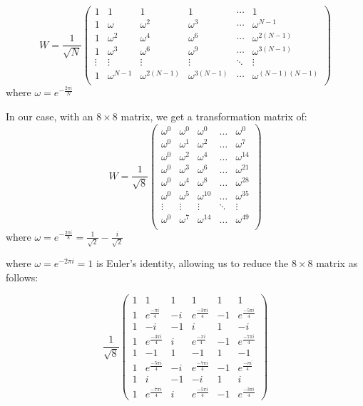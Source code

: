 \documentclass{article}
\begin{document}
\[ W = \frac{1}{\sqrt{N}}  
	\begin{pmatrix}
		1&1&1&1&\cdots &1 \\
		1&\omega&\omega^2&\omega^3&\cdots&\omega^{N-1} \\
		1&\omega^2&\omega^4&\omega^6&\cdots&\omega^{2(N-1)}\\
		1&\omega^3&\omega^6&\omega^9&\cdots&\omega^{3(N-1)}\\
		\vdots&\vdots&\vdots&\vdots&\ddots&\vdots\\
		1&\omega^{N-1}&\omega^{2(N-1)}&\omega^{3(N-1)}&\cdots&\omega^{(N-1)(N-1)}\\
	\end{pmatrix}
\]
where $ \omega = e^{-\frac{2\pi i}{N}} $ 


In our case, with an $8\times8$ matrix, we get a transformation matrix of:
\[ W= 
	\frac{1}{\sqrt{8}}
	\begin{pmatrix}
		\omega^0     & \omega^0   &\omega^0   & \ldots & \omega^0        \\
		\omega^0     & \omega^1   &\omega^2   & \ldots & \omega^7        \\
		\omega^0     & \omega^2   &\omega^4   & \ldots & \omega^{14}     \\
		\omega^0     & \omega^3   &\omega^6   & \ldots & \omega^{21}     \\
		\omega^0     & \omega^4   &\omega^8   & \ldots & \omega^{28}     \\
		\omega^0     & \omega^5   &\omega^{10}   & \ldots & \omega^{35}  \\
		\vdots       & \vdots     & \vdots       & \ddots & \vdots       \\
		\omega^0     & \omega^7   &\omega^{14}   & \ldots  & \omega^{49} \\
	\end{pmatrix}
\]
where $\omega = e^{-\frac{2 \pi i}{8}} = \frac{1}{\sqrt{2}} -
\frac{i}{\sqrt{2}}$


where $ \omega = e^{-2\pi i} = 1 $  is Euler's identity, allowing us to reduce
the $8 \times 8$ matrix as follows:

\[ 
  \frac{1}{\sqrt{8}}
	\begin{pmatrix}
		1 & 1                      & 1    & 1                       &  1  & 1             \\
		1 & e^{\frac{- \pi i}{4}}  & -i   & e^{\frac{-3 \pi i}{4}}  & -1  & e^{\frac{-5 \pi i}{4}}        \\
		1 & -i                     & -1   & i                       &  1  & -i        \\
		1 & e^{\frac{-3 \pi i}{4}} &  i   &  e^{\frac{- \pi i}{4}}  & -1  & e^{\frac{-7 \pi i}{4}}      \\
		1 & -1                     & 1    &  -1                     &  1  & -1         \\
		1 & e^{\frac{-5 \pi i}{4}} &  -i  &  e^{\frac{-7 \pi i}{4}} & -1  & e^{\frac{- \pi i}{4}}         \\
		1 & i                      & -1   &  -i                     &  1  & i        \\
		1 & e^{\frac{-7 \pi i}{4}} & i    &  e^{\frac{-5 \pi i}{4}} & -1  &e^{\frac{-3 \pi i}{4}} 
	\end{pmatrix}
\]
\end{document}
